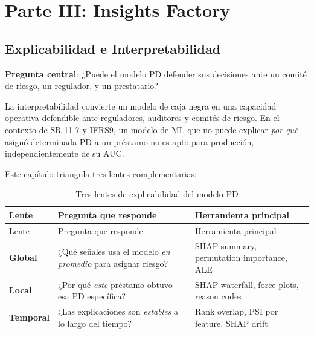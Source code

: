 \documentclass[
  spanish,
  11pt,
  letterpaper,
]{scrbook}
\theoremstyle{plain}
\theoremstyle{remark}
\begin{document}
\part{Parte III: Insights Factory}

\chapter{Explicabilidad e
Interpretabilidad}\label{explicabilidad-e-interpretabilidad}

\textbf{Pregunta central}: ¿Puede el modelo PD defender sus decisiones
ante un comité de riesgo, un regulador, y un prestatario?

La interpretabilidad convierte un modelo de caja negra en una capacidad
operativa defendible ante reguladores, auditores y comités de riesgo. En
el contexto de SR 11-7 y IFRS9, un modelo de ML que no puede explicar
\emph{por qué} asignó determinada PD a un préstamo no es apto para
producción, independientemente de su AUC.

Este capítulo triangula tres lentes complementarias:

\begin{longtable}[]{@{}
  >{\raggedright\arraybackslash}p{}
  >{\raggedright\arraybackslash}p{}
  >{\raggedright\arraybackslash}p{}@{}}
\caption{Tres lentes de explicabilidad del modelo
PD}\label{tbl-explainability-lenses}\tabularnewline
\toprule\noalign{}
\begin{minipage}[b]{\linewidth}\raggedright
Lente
\end{minipage} & \begin{minipage}[b]{\linewidth}\raggedright
Pregunta que responde
\end{minipage} & \begin{minipage}[b]{\linewidth}\raggedright
Herramienta principal
\end{minipage} \\
\midrule\noalign{}
\endfirsthead
\toprule\noalign{}
\begin{minipage}[b]{\linewidth}\raggedright
Lente
\end{minipage} & \begin{minipage}[b]{\linewidth}\raggedright
Pregunta que responde
\end{minipage} & \begin{minipage}[b]{\linewidth}\raggedright
Herramienta principal
\end{minipage} \\
\midrule\noalign{}
\endhead
\bottomrule\noalign{}
\endlastfoot
\textbf{Global} & ¿Qué señales usa el modelo \emph{en promedio} para
asignar riesgo? & SHAP summary, permutation importance, ALE \\
\textbf{Local} & ¿Por qué \emph{este} préstamo obtuvo esa PD específica?
& SHAP waterfall, force plots, reason codes \\
\textbf{Temporal} & ¿Las explicaciones son \emph{estables} a lo largo
del tiempo? & Rank overlap, PSI por feature, SHAP drift \\
\end{longtable}
\end{document}

